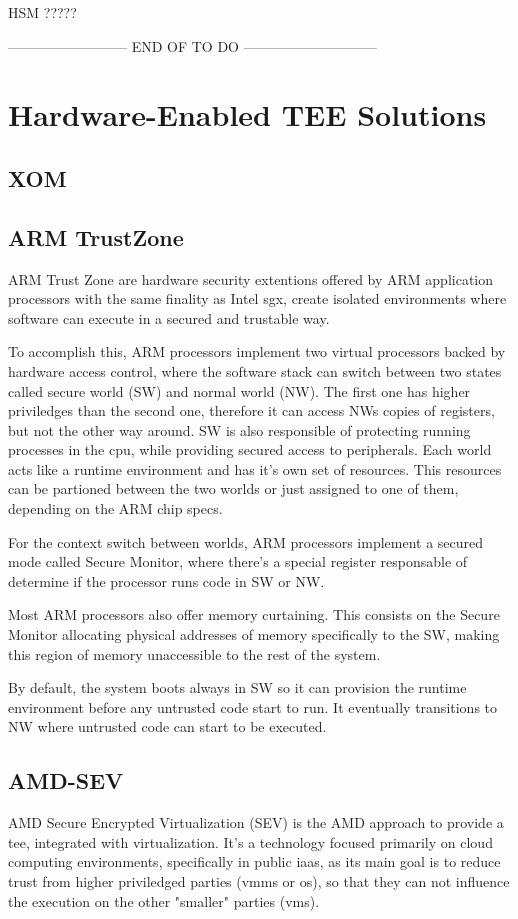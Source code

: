  			HSM ?????

-------------------------- END OF TO DO -----------------------------

\section{Hardware-Enabled TEE Solutions}
\subsection{XOM}
\subsection{ARM TrustZone}
\label{ssec:armtz}

ARM Trust Zone \cite{armTZPaper} are hardware security extentions offered by ARM application processors with the same finality as Intel \gls{sgx}, create isolated environments where software can execute in a secured and trustable way. 

To accomplish this, ARM processors implement two virtual processors backed by hardware access control, where the software stack can switch between two states called secure world (SW) and normal world (NW). 
The first one has higher priviledges than the second one, therefore it can access NWs copies of registers, but not the other way around. SW is also responsible of protecting running processes in the \gls{cpu}, while providing secured access to peripherals. 
Each world acts like a runtime environment and has it's own set of resources. This resources can be partioned between the two worlds or just assigned to one of them, depending on the ARM chip specs.

For the context switch between worlds, ARM processors implement a secured mode called Secure Monitor, where there's a special register responsable of determine if the processor runs code in SW or NW. 

Most ARM processors also offer memory curtaining. This consists on the Secure Monitor allocating physical addresses of memory specifically to the SW, making this region of memory unaccessible to the rest of the system.

By default, the system boots always in SW so it can provision the runtime environment before any untrusted code start to run. It eventually transitions to NW where untrusted code can start to be executed. 

\subsection{AMD-SEV}
\label{ssec:amdsev}
AMD Secure Encrypted Virtualization (SEV) is the AMD approach to provide a \gls{tee}, integrated with virtualization. It's a technology focused primarily on cloud computing environments, specifically in public \gls{iaas}, as its main goal is to reduce trust from higher priviledged parties (\gls{vmm}s or \gls{os}), so that they can not influence the execution on the other "smaller" parties (\gls{vm}s). 


